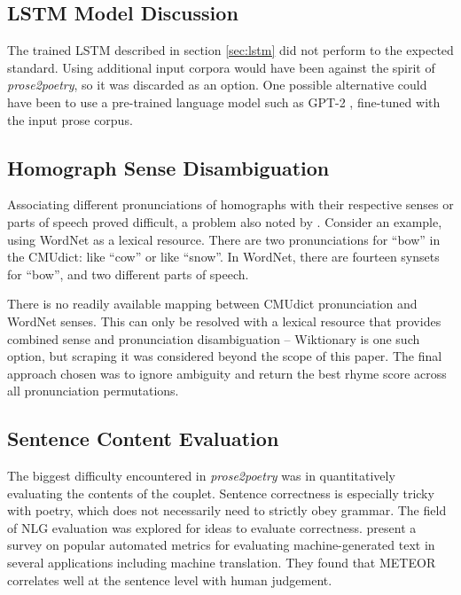 \documentclass[11pt,a4paper]{article}
\begin{document}
\subsection{LSTM Model Discussion}
\label{sec:discconclstm}

The trained LSTM described in section \ref{sec:lstm} did not perform to the expected standard. Using additional input corpora would have been against the spirit of \textit{prose2poetry}, so it was discarded as an option. One possible alternative could have been to use a pre-trained language model such as GPT-2 \cite{gpt2}, fine-tuned with the input prose corpus.

\subsection{Homograph Sense Disambiguation}
\label{sec:synset}

Associating different pronunciations of homographs with their respective senses or parts of speech proved difficult, a problem also noted by \citet{hopkins-kiela-2017}. Consider an example, using WordNet \cite{wordnet} as a lexical resource. There are two pronunciations for ``bow'' in the CMUdict: like ``cow'' or like ``snow''. In WordNet, there are fourteen synsets for ``bow'', and two different parts of speech.

There is no readily available mapping between CMUdict pronunciation and WordNet senses. This can only be resolved with a lexical resource that provides combined sense and pronunciation disambiguation -- Wiktionary \cite{wiktionary} is one such option, but scraping it was considered beyond the scope of this paper. The final approach chosen was to ignore ambiguity and return the best rhyme score across all pronunciation permutations.

\subsection{Sentence Content Evaluation}
\label{sec:nlg}

The biggest difficulty encountered in \textit{prose2poetry} was in quantitatively evaluating the contents of the couplet. Sentence correctness is especially tricky with poetry, which does not necessarily need to strictly obey grammar. The field of NLG evaluation was explored for ideas to evaluate correctness. \citet{nlgeval} present a survey on popular automated metrics for evaluating machine-generated text in several applications including machine translation. They found that METEOR \cite{meteor} correlates well at the sentence level with human judgement.
\end{document}
